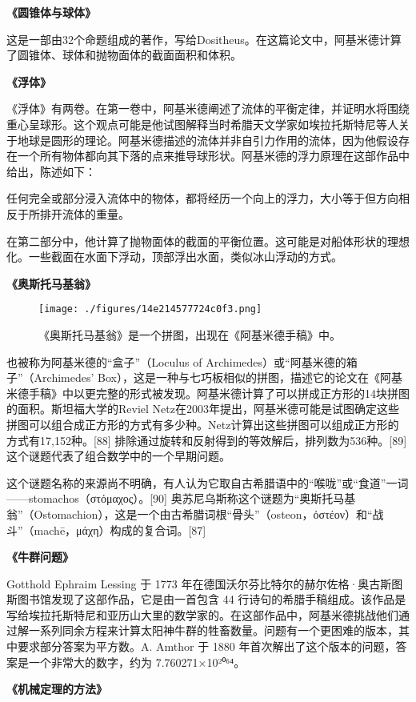 \textbf{《圆锥体与球体》}

这是一部由32个命题组成的著作，写给Dositheus。在这篇论文中，阿基米德计算了圆锥体、球体和抛物面体的截面面积和体积。

\textbf{《浮体》}

《浮体》有两卷。在第一卷中，阿基米德阐述了流体的平衡定律，并证明水将围绕重心呈球形。这个观点可能是他试图解释当时希腊天文学家如埃拉托斯特尼等人关于地球是圆形的理论。阿基米德描述的流体并非自引力作用的流体，因为他假设存在一个所有物体都向其下落的点来推导球形状。阿基米德的浮力原理在这部作品中给出，陈述如下：

任何完全或部分浸入流体中的物体，都将经历一个向上的浮力，大小等于但方向相反于所排开流体的重量。

在第二部分中，他计算了抛物面体的截面的平衡位置。这可能是对船体形状的理想化。一些截面在水面下浮动，顶部浮出水面，类似冰山浮动的方式。

\textbf{《奥斯托马基翁》}
\begin{figure}[ht]
\centering
\texttt{[image: ./figures/14e214577724c0f3.png]}
\caption{《奥斯托马基翁》是一个拼图，出现在《阿基米德手稿》中。} \label{fig_Archim_9}
\end{figure}
也被称为阿基米德的“盒子”（Loculus of Archimedes）或“阿基米德的箱子”（Archimedes' Box），这是一种与七巧板相似的拼图，描述它的论文在《阿基米德手稿》中以更完整的形式被发现。阿基米德计算了可以拼成正方形的14块拼图的面积。斯坦福大学的Reviel Netz在2003年提出，阿基米德可能是试图确定这些拼图可以组合成正方形的方式有多少种。Netz计算出这些拼图可以组成正方形的方式有17,152种。[88] 排除通过旋转和反射得到的等效解后，排列数为536种。[89] 这个谜题代表了组合数学中的一个早期问题。

这个谜题名称的来源尚不明确，有人认为它取自古希腊语中的“喉咙”或“食道”一词——stomachos（στόμαχος）。[90] 奥苏尼乌斯称这个谜题为“奥斯托马基翁”（Ostomachion），这是一个由古希腊词根“骨头”（osteon，ὀστέον）和“战斗”（machē，μάχη）构成的复合词。[87]

\textbf{《牛群问题》}  

Gotthold Ephraim Lessing 于 1773 年在德国沃尔芬比特尔的赫尔佐格·奥古斯图斯图书馆发现了这部作品，它是由一首包含 44 行诗句的希腊手稿组成。该作品是写给埃拉托斯特尼和亚历山大里的数学家的。在这部作品中，阿基米德挑战他们通过解一系列同余方程来计算太阳神牛群的牲畜数量。问题有一个更困难的版本，其中要求部分答案为平方数。A. Amthor 于 1880 年首次解出了这个版本的问题，答案是一个非常大的数字，约为 7.760271×10²⁰⁶⁴。

\textbf{《机械定理的方法》}  

